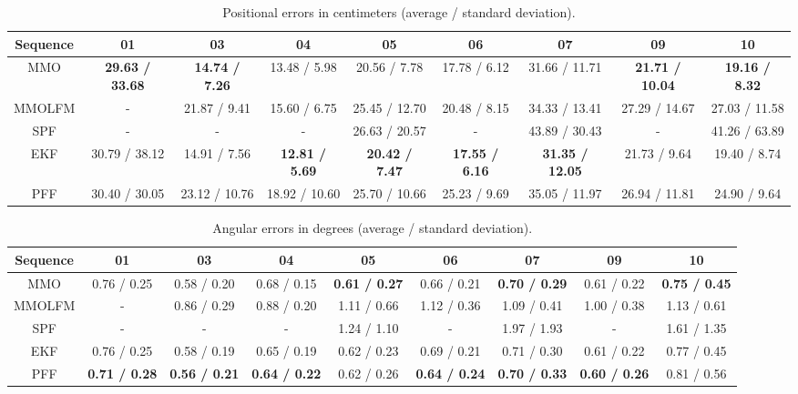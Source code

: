 \documentclass[letterpaper, 10 pt, conference]{ieeeconf}  %
\begin{document}
\begin{table*}[!t]
\begin{center}
\caption{Positional errors in centimeters (average / standard deviation).}
\begin{tabular}{c|c|c|c|c|c|c|c|c} \hline
Sequence & 01 & 03 & 04 & 05 & 06 & 07 & 09 & 10 \\ \hline
MMO & {\bf 29.63 / 33.68} & {\bf 14.74 / 7.26} & 13.48 / 5.98 & 20.56 / 7.78 & 17.78 / 6.12 & 31.66 / 11.71 & {\bf 21.71 / 10.04} & {\bf 19.16 / 8.32} \\ \hline
MMOLFM & - & 21.87 / 9.41 & 15.60 / 6.75 & 25.45 / 12.70 & 20.48 / 8.15 & 34.33 / 13.41 & 27.29 / 14.67 & 27.03 / 11.58 \\ \hline
SPF & - & - & - & 26.63 / 20.57 & - & 43.89 / 30.43 & - & 41.26 / 63.89 \\ \hline
EKF & 30.79 / 38.12 & 14.91 / 7.56 & {\bf 12.81 / 5.69} & {\bf 20.42 / 7.47} & {\bf 17.55 / 6.16} & {\bf 31.35 / 12.05} & 21.73 / 9.64 & 19.40 / 8.74 \\ \hline
PFF & 30.40 / 30.05 & 23.12 / 10.76 & 18.92 / 10.60 & 25.70 / 10.66 & 25.23 / 9.69 & 35.05 / 11.97 & 26.94 / 11.81 & 24.90 / 9.64 \\ \hline
\end{tabular}
\label{tab:positional_errors}
\end{center}
\end{table*}

\begin{table*}[!t]
\begin{center}
\caption{Angular errors in degrees (average / standard deviation).}
\begin{tabular}{c|c|c|c|c|c|c|c|c} \hline
Sequence & 01 & 03 & 04 & 05 & 06 & 07 & 09 & 10 \\ \hline
MMO & 0.76 / 0.25 & 0.58 / 0.20 & 0.68 / 0.15 & {\bf 0.61 / 0.27} & 0.66 / 0.21 & {\bf 0.70 / 0.29} & 0.61 / 0.22 & {\bf 0.75 / 0.45} \\ \hline
MMOLFM & - & 0.86 / 0.29 & 0.88 / 0.20 & 1.11 / 0.66 & 1.12 / 0.36 & 1.09 / 0.41 & 1.00 / 0.38 & 1.13 / 0.61 \\ \hline
SPF & - & - & - & 1.24 / 1.10 & - & 1.97 / 1.93 & - & 1.61 / 1.35 \\ \hline
EKF & 0.76 / 0.25 & 0.58 / 0.19 & 0.65 / 0.19 & 0.62 / 0.23 & 0.69 / 0.21 & 0.71 / 0.30 & 0.61 / 0.22 & 0.77 / 0.45 \\ \hline
PFF & {\bf 0.71 / 0.28} & {\bf 0.56 / 0.21} & {\bf 0.64 / 0.22} & 0.62 / 0.26 & {\bf 0.64 / 0.24} & {\bf 0.70 / 0.33} & {\bf 0.60 / 0.26} & 0.81 / 0.56 \\ \hline
\end{tabular}
\label{tab:angular_errors}
\end{center}
\end{table*}
\end{document}
